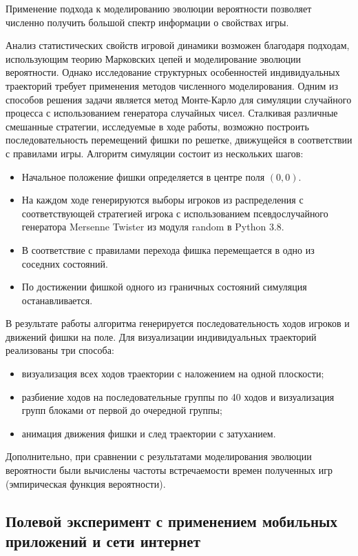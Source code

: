 Применение подхода к моделированию эволюции вероятности позволяет численно получить большой спектр информации о свойствах игры.

Анализ статистических свойств игровой динамики возможен благодаря подходам, использующим теорию Марковских цепей и моделирование эволюции вероятности. Однако исследование структурных особенностей индивидуальных траекторий требует применения методов численного моделирования. Одним из способов решения задачи является метод Монте-Карло для симуляции случайного процесса с использованием генератора случайных чисел. Сталкивая различные смешанные стратегии, исследуемые в ходе работы, возможно построить последовательность перемещений фишки по решетке, движущейся в соответствии с правилами игры. Алгоритм симуляции состоит из нескольких шагов:
\begin{itemize}
\item Начальное положение фишки определяется в центре поля $(0, 0)$. 
\item На каждом ходе генерируются выборы игроков из распределения с соответствующей стратегией игрока с использованием псевдослучайного генератора Mersenne Twister \cite{matsumoto_mersenne_1998} из модуля random в Python 3.8.
\item В соответствие с правилами перехода фишка перемещается в одно из соседних состояний.
\item По достижении фишкой одного из граничных состояний симуляция останавливается.
\end{itemize}

В результате работы алгоритма генерируется последовательность ходов игроков и движений фишки на поле. Для визуализации индивидуальных траекторий реализованы три способа: 
\begin{itemize}
\item визуализация всех ходов траектории с наложением на одной плоскости;
\item разбиение ходов на последовательные группы по 40 ходов и визуализация групп блоками от первой до очередной группы;
\item анимация движения фишки и след траектории с затуханием.
\end{itemize}

Дополнительно, при сравнении с результатами моделирования эволюции вероятности были вычислены частоты встречаемости времен полученных игр (эмпирическая функция вероятности). 

\subsection{Полевой эксперимент с применением мобильных приложений и сети интернет}\label{subsec:ch3/sec2/sub3}

